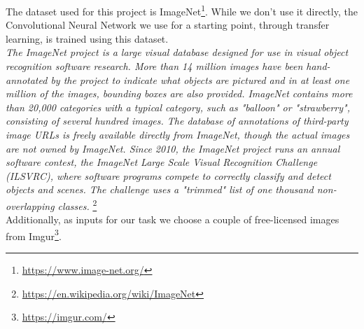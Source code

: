 The dataset used for this project is ImageNet\footnote{\href{https://www.image-net.org/}{https://www.image-net.org/}}.
While we don't use it directly, the Convolutional Neural Network we use for a starting point, through transfer learning, is trained using this dataset.\\
\emph{The ImageNet project is a large visual database designed for use in visual object recognition software research. More than 14 million images have been hand-annotated by the project to indicate what objects are pictured and in at least one million of the images, bounding boxes are also provided. ImageNet contains more than 20,000 categories with a typical category, such as "balloon" or "strawberry", consisting of several hundred images. The database of annotations of third-party image URLs is freely available directly from ImageNet, though the actual images are not owned by ImageNet. Since 2010, the ImageNet project runs an annual software contest, the ImageNet Large Scale Visual Recognition Challenge (ILSVRC), where software programs compete to correctly classify and detect objects and scenes. The challenge uses a "trimmed" list of one thousand non-overlapping classes.}
\footnote{\href{https://en.wikipedia.org/wiki/ImageNet}{https://en.wikipedia.org/wiki/ImageNet}}\\
Additionally, as inputs for our task we choose a couple of free-licensed images from Imgur\footnote{\href{https://imgur.com/}{https://imgur.com/}}.
